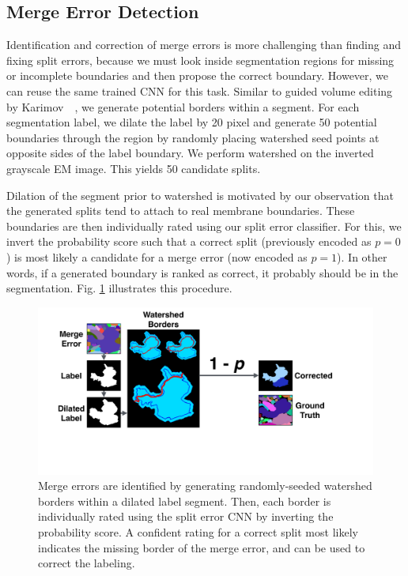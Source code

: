 \subsection{Merge Error Detection}

Identification and correction of merge errors is more challenging than finding and fixing split errors, because we must look inside segmentation regions for missing or incomplete boundaries and then propose the correct boundary. However, we can reuse the same trained CNN for this task. Similar to guided volume editing by Karimov~\etal~\cite{karimov_guided_volume_editing}, we generate potential borders within a segment. For each segmentation label, we dilate the label by 20 pixel and generate 50 potential boundaries through the region by randomly placing watershed seed points at opposite sides of the label boundary. We perform watershed on the inverted grayscale EM image. This yields 50 candidate splits.

Dilation of the segment prior to watershed is motivated by our observation that the generated splits tend to attach to real membrane boundaries. These boundaries are then individually rated using our split error classifier. For this, we invert the probability score such that a correct split (previously encoded as $p=0$) is most likely a candidate for a merge error (now encoded as $p=1$). In other words, if a generated boundary is ranked as correct, it probably should be in the segmentation. Fig. \ref{fig:merge_error} illustrates this procedure.

\begin{figure}[t]
\centering
\includegraphics[width=\linewidth]{gfx/merge_error_v4.pdf}
\caption{Merge errors are identified by generating randomly-seeded watershed borders within a dilated label segment. Then, each border is individually rated using the split error CNN by inverting the probability score. A confident rating for a correct split most likely indicates the missing border of the merge error, and can be used to correct the labeling.}
\label{fig:merge_error}
\end{figure}

